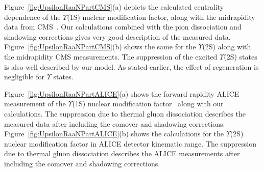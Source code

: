 \documentclass[12pt,a4paper,final]{iopart} %
\begin{document}
Figure~\ref{fig:UpsilonRaaNPartCMS}(a) depicts the calculated 
centrality dependence of the $\Upsilon$(1S) nuclear
modification factor, along with the midrapidity data from CMS~\cite{CMS:2017ucd}.
Our calculations combined with the pion dissociation and shadowing corrections 
gives very good description of the measured data. Figure~\ref{fig:UpsilonRaaNPartCMS}(b)
shows the same for the $\Upsilon$(2S) along with the midrapidity
CMS measurements. The suppression of the excited $\Upsilon$(2S) states 
is also well described by our model. As stated earlier, the effect of regeneration is
negligible for $\Upsilon$ states. 

Figure~\ref{fig:UpsilonRaaNPartALICE}(a) shows the forward rapidity ALICE
measurement of the $\Upsilon$(1S) nuclear modification factor~\cite{ALICE:Y5TeV}
along with our calculations. The suppression due to thermal gluon dissociation 
describes the measured data after including the comover and shadowing corrections.
Figure~\ref{fig:UpsilonRaaNPartALICE}(b) shows the calculations for the
$\Upsilon$(2S) nuclear modification factor in ALICE detector kinematic range.
The suppression due to thermal gluon dissociation describes the
ALICE measurements after including the comover and shadowing corrections.


\end{document}
